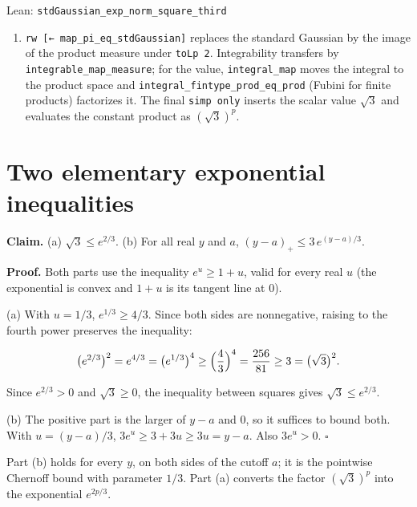 \documentclass[11pt,a4paper]{article}
\begin{document}
\begin{leanbox}{Lean: \texttt{stdGaussian\_\allowbreak{}exp\_\allowbreak{}norm\_\allowbreak{}square\_\allowbreak{}third}}
\begin{enumerate}
\item \texttt{rw [← map\_\allowbreak{}pi\_\allowbreak{}eq\_\allowbreak{}std\allowbreak{}Gaussian]} replaces the standard Gaussian by the image of the product measure under \texttt{to\allowbreak{}Lp 2}. Integrability transfers by \texttt{integrable\_\allowbreak{}map\_\allowbreak{}measure}; for the value, \texttt{integral\_\allowbreak{}map} moves the integral to the product space and \texttt{integral\_\allowbreak{}fintype\_\allowbreak{}prod\_\allowbreak{}eq\_\allowbreak{}prod} (Fubini for finite products) factorizes it. The final \texttt{simp only} inserts the scalar value \(\sqrt3\) and evaluates the constant product as \((\sqrt3)^p\).

\end{enumerate}
\end{leanbox}

\section{\texorpdfstring{Two elementary exponential inequalities}{Two elementary exponential inequalities}}


\textbf{Claim.} (a) \(\sqrt3\le e^{2/3}\). (b) For all real \(y\) and \(a\), \((y-a)_+\le3\,e^{(y-a)/3}\).




\textbf{Proof.} Both parts use the inequality \(e^u\ge1+u\), valid for every real \(u\) (the exponential is convex and \(1+u\) is its tangent line at \(0\)).




(a) With \(u=1/3\), \(e^{1/3}\ge4/3\). Since both sides are nonnegative, raising to the fourth power preserves the inequality:


\[\bigl(e^{2/3}\bigr)^2=e^{4/3}=\bigl(e^{1/3}\bigr)^4\ge\Bigl(\frac43\Bigr)^4=\frac{256}{81}\ge3=\bigl(\sqrt3\bigr)^2.\]


Since \(e^{2/3}>0\) and \(\sqrt3\ge0\), the inequality between squares gives \(\sqrt3\le e^{2/3}\).




(b) The positive part is the larger of \(y-a\) and \(0\), so it suffices to bound both. With \(u=(y-a)/3\), \(3e^u\ge3+3u\ge3u=y-a\). Also \(3e^u>0\). \(\square\)




Part (b) holds for every \(y\), on both sides of the cutoff \(a\); it is the pointwise Chernoff bound with parameter \(1/3\). Part (a) converts the factor \((\sqrt3)^p\) into the exponential \(e^{2p/3}\).
\end{document}
